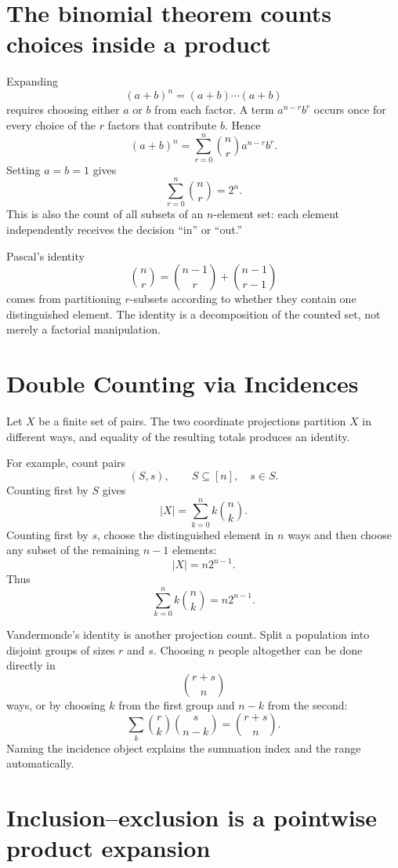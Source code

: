 \section{The binomial theorem counts choices inside a product}

Expanding
\[
  (a+b)^n
  =(a+b)\cdots(a+b)
\]
requires choosing either \(a\) or \(b\) from each factor.  A term \(a^{n-r}b^r\) occurs once for every choice of the \(r\) factors that contribute \(b\).  Hence
\[
  \boxed{
  (a+b)^n
  =\sum_{r=0}^n\binom nr a^{n-r}b^r.}
\]
Setting \(a=b=1\) gives
\[
  \sum_{r=0}^n\binom nr=2^n.
\]
This is also the count of all subsets of an \(n\)-element set: each element independently receives the decision “in” or “out.”

Pascal's identity
\[
  \binom nr
  =\binom{n-1}r+\binom{n-1}{r-1}
\]
comes from partitioning \(r\)-subsets according to whether they contain one distinguished element.  The identity is a decomposition of the counted set, not merely a factorial manipulation.

\section{Double Counting via Incidences}

Let \(X\) be a finite set of pairs.  The two coordinate projections partition \(X\) in different ways, and equality of the resulting totals produces an identity.

For example, count pairs
\[
  (S,s),
  \qquad
  S\subseteq[n],
  \quad
  s\in S.
\]
Counting first by \(S\) gives
\[
  |X|=\sum_{k=0}^n k\binom nk.
\]
Counting first by \(s\), choose the distinguished element in \(n\) ways and then choose any subset of the remaining \(n-1\) elements:
\[
  |X|=n2^{n-1}.
\]
Thus
\[
  \boxed{
  \sum_{k=0}^n k\binom nk=n2^{n-1}.}
\]

Vandermonde's identity is another projection count.  Split a population into disjoint groups of sizes \(r\) and \(s\).  Choosing \(n\) people altogether can be done directly in
\[
  \binom{r+s}{n}
\]
ways, or by choosing \(k\) from the first group and \(n-k\) from the second:
\[
  \boxed{
  \sum_k\binom rk\binom s{n-k}
  =\binom{r+s}{n}.}
\]
Naming the incidence object explains the summation index and the range automatically.

\section{Inclusion--exclusion is a pointwise product expansion}

